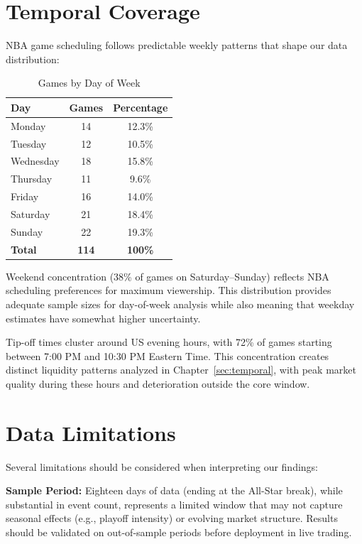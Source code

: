 \section{Temporal Coverage}

NBA game scheduling follows predictable weekly patterns that shape our data distribution:

\begin{table}[H]
\centering
\caption{Games by Day of Week}
\label{tab:day-distribution}
\begin{tabular}{lcc}
\toprule
\textbf{Day} & \textbf{Games} & \textbf{Percentage} \\
\midrule
Monday & 14 & 12.3\% \\
Tuesday & 12 & 10.5\% \\
Wednesday & 18 & 15.8\% \\
Thursday & 11 & 9.6\% \\
Friday & 16 & 14.0\% \\
Saturday & 21 & 18.4\% \\
Sunday & 22 & 19.3\% \\
\midrule
\textbf{Total} & \textbf{114} & \textbf{100\%} \\
\bottomrule
\end{tabular}
\end{table}

Weekend concentration (38\% of games on Saturday--Sunday) reflects NBA scheduling preferences for maximum viewership. This distribution provides adequate sample sizes for day-of-week analysis while also meaning that weekday estimates have somewhat higher uncertainty.

Tip-off times cluster around US evening hours, with 72\% of games starting between 7:00 PM and 10:30 PM Eastern Time. This concentration creates distinct liquidity patterns analyzed in Chapter~\ref{sec:temporal}, with peak market quality during these hours and deterioration outside the core window.

\section{Data Limitations}

Several limitations should be considered when interpreting our findings:

\textbf{Sample Period:} Eighteen days of data (ending at the All-Star break), while substantial in event count, represents a limited window that may not capture seasonal effects (e.g., playoff intensity) or evolving market structure. Results should be validated on out-of-sample periods before deployment in live trading.

